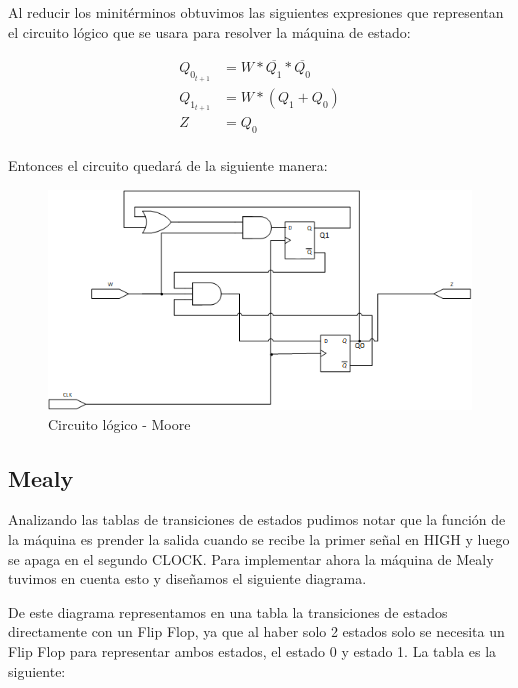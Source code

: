 \documentclass[10pt,a4paper]{article}
\begin{document}



Al reducir los minitérminos obtuvimos las siguientes expresiones que representan el circuito lógico que se usara para resolver la máquina de estado:

\begin{align*}
	Q_{0_{t+1}} &= W * \overline{Q_{1}} * \overline{Q_{0}}\\
	Q_{1_{t+1}} &= W * (Q_{1} + Q_{0})  \\
	Z &= Q_{0} \\
\end{align*}


Entonces el circuito quedará de la siguiente manera:

\begin{figure}[hbtp]
	\centering
	\includegraphics[scale=1]{Imagenes/circej3.png}
	\caption{Circuito lógico - Moore}
	\label{3_fig6}
\end{figure}


\subsection{Mealy}
Analizando las tablas de transiciones de estados pudimos notar que la función de la máquina es prender la salida cuando se recibe la primer señal en HIGH y luego se apaga en el segundo CLOCK. Para implementar ahora la máquina de Mealy tuvimos en cuenta esto y diseñamos el siguiente diagrama.

De este diagrama representamos en una tabla la transiciones de estados directamente con un Flip Flop, ya que al haber solo 2 estados solo se necesita un Flip Flop para representar ambos estados, el estado 0 y estado 1. La tabla es la siguiente:
\end{document}
